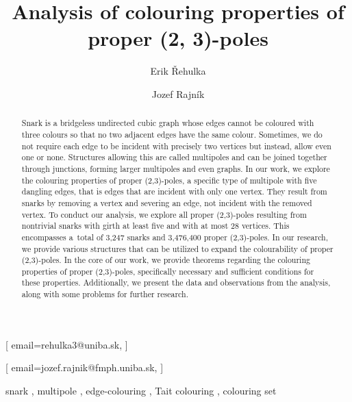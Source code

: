 \documentclass[
twocolumn,
]{ceurart}
\begin{document}


\title{Analysis of colouring properties of proper (2, 3)-poles}


\author[1]{Erik Řehulka}[%
email=rehulka3@uniba.sk,
]
\address[1]{Comenius University, Mlynská dolina, 842 48 Bratislava, Slovakia}

\author[1]{Jozef Rajník}[%
email=jozef.rajnik@fmph.uniba.sk,
]

\begin{abstract}
  Snark is a bridgeless undirected cubic graph whose edges cannot be coloured with three colours so that no two adjacent edges have the same colour. Sometimes, we do not require each edge to be incident with precisely two vertices but instead, allow even one or none. Structures allowing this are called multipoles and can be joined together through junctions, forming larger multipoles and even graphs. In our work, we explore the colouring properties of proper (2,3)-poles, a specific type of multipole with five dangling edges, that is edges that are incident with only one vertex. They result from snarks by removing a vertex and severing an edge, not incident with the removed vertex. To conduct our analysis, we explore all proper (2,3)-poles resulting from nontrivial snarks with girth at least five and with at most 28 vertices. This encompasses a~total of 3,247 snarks and 3,476,400 proper (2,3)-poles. In our research, we provide various structures that can be utilized to expand the colourability of proper (2,3)-poles. In the core of our work, we provide theorems regarding the colouring properties of proper (2,3)-poles, specifically necessary and sufficient conditions for these properties. Additionally, we present the data and observations from the analysis, along with some problems for further research.
\end{abstract}

\begin{keywords}
	snark \sep 
	multipole \sep 
	edge-colouring \sep 
	Tait colouring \sep 
	colouring set
\end{keywords}
\end{document}
